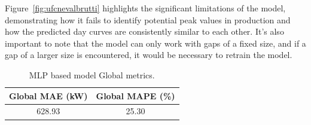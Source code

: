Figure~\ref{fig:ufcnevalbrutti} highlights the significant limitations
of the model, demonstrating how it fails to identify potential peak
values in production and how the predicted day curves are consistently similar
to each other.
It's also important to note that the model can only work with
gaps of a fixed size, and if a gap of a larger size is encountered,
it would be necessary to retrain the model.



\begin{table}[H]
	\centering
	\begin{tabular}{c|c}
		\multicolumn{1}{c|}{\textbf{Global MAE (kW)}} &
		\multicolumn{1}{c}{\textbf{Global MAPE (\%)}}         \\
		\hline
		628.93                                        & 25.30 \\
	\end{tabular}
	\caption{MLP based model Global metrics.}
	\label{tab:globalmetrics}
\end{table}